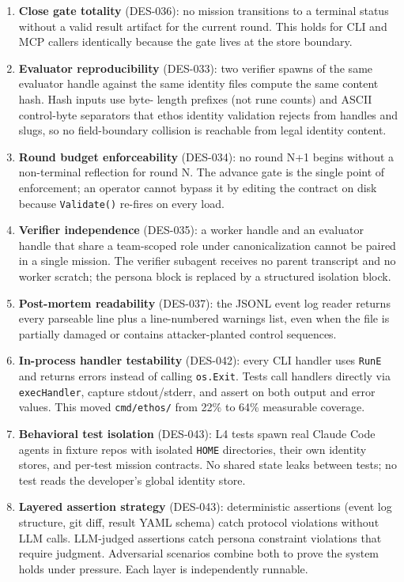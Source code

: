 \documentclass[a4paper,10pt]{article}
\newcommand{\pkg}[1]{\texttt{#1}}
\begin{document}
\begin{enumerate}
  \item \textbf{Close gate totality} (DES-036): no mission
    transitions to a terminal status without a valid result
    artifact for the current round.  This holds for CLI and MCP
    callers identically because the gate lives at the store
    boundary.

  \item \textbf{Evaluator reproducibility} (DES-033): two verifier
    spawns of the same evaluator handle against the same identity
    files compute the same content hash.  Hash inputs use byte-
    length prefixes (not rune counts) and ASCII control-byte
    separators that ethos identity validation rejects from handles
    and slugs, so no field-boundary collision is reachable from
    legal identity content.

  \item \textbf{Round budget enforceability} (DES-034): no round
    N+1 begins without a non-terminal reflection for round N.  The
    advance gate is the single point of enforcement; an operator
    cannot bypass it by editing the contract on disk because
    \texttt{Validate()} re-fires on every load.

  \item \textbf{Verifier independence} (DES-035): a worker handle
    and an evaluator handle that share a team-scoped role under
    canonicalization cannot be paired in a single mission.  The
    verifier subagent receives no parent transcript and no worker
    scratch; the persona block is replaced by a structured
    isolation block.

  \item \textbf{Post-mortem readability} (DES-037): the JSONL
    event log reader returns every parseable line plus a
    line-numbered warnings list, even when the file is partially
    damaged or contains attacker-planted control sequences.

  \item \textbf{In-process handler testability} (DES-042): every
    CLI handler uses \texttt{RunE} and returns errors instead of
    calling \texttt{os.Exit}.  Tests call handlers directly via
    \texttt{execHandler}, capture stdout/stderr, and assert on
    both output and error values.  This moved \pkg{cmd/ethos/}
    from 22\% to 64\% measurable coverage.

  \item \textbf{Behavioral test isolation} (DES-043): L4 tests
    spawn real Claude Code agents in fixture repos with isolated
    \texttt{HOME} directories, their own identity stores, and
    per-test mission contracts.  No shared state leaks between
    tests; no test reads the developer's global identity store.

  \item \textbf{Layered assertion strategy} (DES-043):
    deterministic assertions (event log structure, git diff,
    result YAML schema) catch protocol violations without LLM
    calls.  LLM-judged assertions catch persona constraint
    violations that require judgment.  Adversarial scenarios
    combine both to prove the system holds under pressure.
    Each layer is independently runnable.
\end{enumerate}
\end{document}
